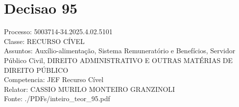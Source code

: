 \documentclass[12pt]{article}
\begin{document}
\section*{Decisao 95}
Processo: 5003714-34.2025.4.02.5101\\
Classe: RECURSO CÍVEL\\
Assuntos: Auxílio-alimentação, Sistema Remuneratório e Benefícios, Servidor Público Civil, DIREITO ADMINISTRATIVO E OUTRAS MATÉRIAS DE DIREITO PÚBLICO\\
Competencia: JEF Recurso Cível\\
Relator: CASSIO MURILO MONTEIRO GRANZINOLI\\
Fonte: ./PDFs/inteiro\_teor\_95.pdf
\end{document}
